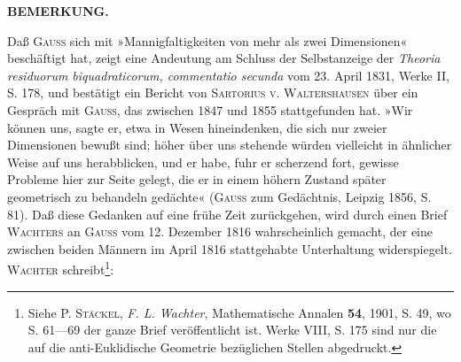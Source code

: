 \begingroup\small
\begin{center}\bfseries BEMERKUNG.\end{center}
\indent Daß \textsc{Gauss} sich mit »Mannigfaltigkeiten von mehr als zwei Dimensionen« beschäftigt hat, zeigt eine Andeutung am Schluss der Selbstanzeige der \textit{Theoria residuorum biquadraticorum, commentatio secunda} vom 23. April 1831, Werke II, S. 178, und bestätigt ein Bericht von \textsc{Sartorius v. Waltershausen} über ein Gespräch mit \textsc{Gauss}, das zwischen 1847 und 1855 stattgefunden hat. »Wir können uns, sagte er, etwa in Wesen hineindenken, die sich nur zweier Dimensionen bewußt sind; höher über uns stehende würden vielleicht in ähnlicher Weise auf uns herabblicken, und er habe, fuhr er scherzend fort, gewisse Probleme hier zur Seite gelegt, die er in einem höhern Zustand später geometrisch zu behandeln gedächte« (\textsc{Gauss} zum Gedächtnis, Leipzig 1856, S. 81). Daß diese Gedanken auf eine frühe Zeit zurückgehen, wird durch einen Brief \textsc{Wachters} an \textsc{Gauss} vom 12. Dezember 1816 wahrscheinlich gemacht, der eine zwischen beiden Männern im April 1816 stattgehabte Unterhaltung widerspiegelt. \textsc{Wachter} schreibt\footnote{Siehe P. \textsc{Stäckel}, \textit{F. L. Wachter}, Mathematische Annalen \textbf{54}, 1901, S. 49, wo S. 61—69 der ganze Brief veröffentlicht ist. Werke VIII, S. 175 sind nur die auf die anti-Euklidische Geometrie bezüglichen Stellen abgedruckt.}:

